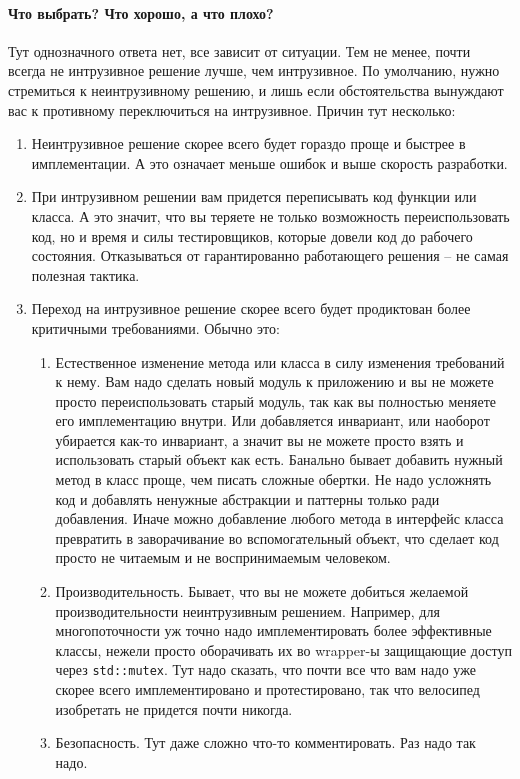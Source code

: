\paragraph{Что выбрать? Что хорошо, а что плохо?}

Тут однозначного ответа нет, все зависит от ситуации.
Тем не менее, почти всегда не интрузивное решение лучше, чем интрузивное.
По умолчанию, нужно стремиться к неинтрузивному решению, и лишь если обстоятельства вынуждают вас к противному переключиться на интрузивное.
Причин тут несколько:
\begin{enumerate}
\item Неинтрузивное решение скорее всего будет гораздо проще и быстрее в имплементации.
А это означает меньше ошибок и выше скорость разработки.

\item При интрузивном решении вам придется переписывать код функции или класса.
А это значит, что вы теряете не только возможность переиспользовать код, но и время и силы тестировщиков, которые довели код до рабочего состояния.
Отказываться от гарантированно работающего решения -- не самая полезная тактика.

\item Переход на интрузивное решение скорее всего будет продиктован более критичными требованиями.
Обычно это:
\begin{enumerate}
\item Естественное изменение метода или класса в силу изменения требований к нему.
Вам надо сделать новый модуль к приложению и вы не можете просто переиспользовать старый модуль, так как вы полностью меняете его имплементацию внутри.
Или добавляется инвариант, или наоборот убирается как-то инвариант, а значит вы не можете просто взять и использовать старый объект как есть.
Банально бывает добавить нужный метод в класс проще, чем писать сложные обертки.
Не надо усложнять код и добавлять ненужные абстракции и паттерны только ради добавления.
Иначе можно добавление любого метода в интерфейс класса превратить в заворачивание во вспомогательный объект, что сделает код просто не читаемым и не воспринимаемым человеком.

\item Производительность.
Бывает, что вы не можете добиться желаемой производительности неинтрузивным решением.
Например, для многопоточности уж точно надо  имплементировать более эффективные классы, нежели просто оборачивать их во wrapper-ы защищающие доступ через \verb"std::mutex".
Тут надо сказать, что почти все что вам надо уже скорее всего имплементировано и протестировано, так что велосипед изобретать не придется почти никогда.

\item Безопасность.
Тут даже сложно что-то комментировать.
Раз надо так надо.
\end{enumerate}
\end{enumerate}

